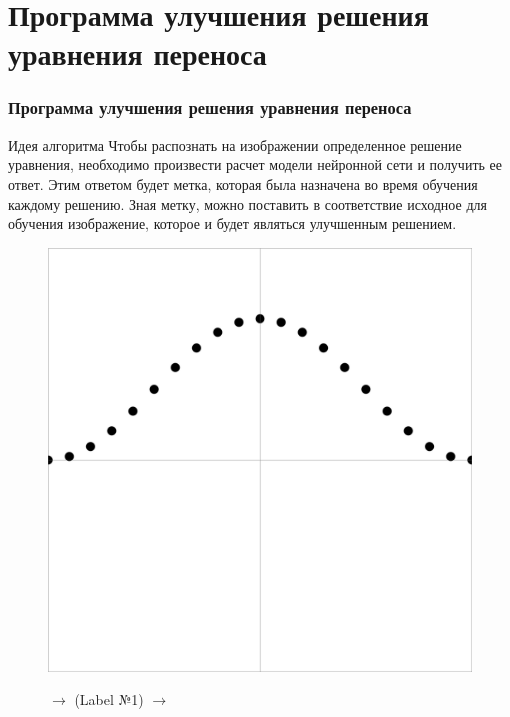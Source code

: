 \documentclass{beamer}
\begin{document}
\section{Программа улучшения решения уравнения переноса}
\begin{frame}
\frametitle{Программа улучшения решения уравнения переноса}
\begin{block}{Идея алгоритма}
	Чтобы распознать на изображении определенное решение уравнения, необходимо произвести расчет модели нейронной сети и получить ее ответ. Этим ответом будет метка, которая была назначена во время обучения каждому решению. Зная метку, можно поставить в соответствие исходное для обучения изображение, которое и будет являться улучшенным решением. 
\end{block}
		\begin{figure}
			\centering
			\begin{minipage}{0.35\textwidth}
				\centering
				\includegraphics[width=\textwidth]{primer1_1}
				\label{fig:first}
			\end{minipage} {$\to$} (Label №1) $\to$\quad
			\begin{minipage}{0.35\textwidth}
				\centering

\end{minipage}
\end{figure}
\end{frame}
\end{document}
